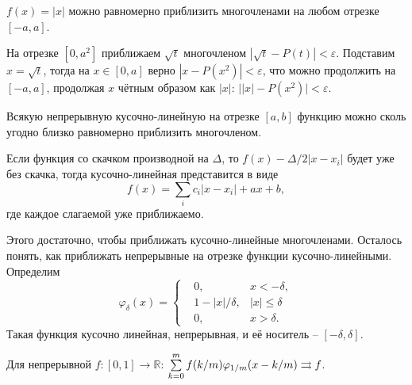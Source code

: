 
\begin{to_lem}
    $f(x) = |x|$ можно равномерно приблизить многочленами на любом отрезке $[-a,a]$.
\end{to_lem}


\begin{uproof}
    На отрезке $[0, a^2]$ приближаем $\sqrt{t}$ многочленом $|\sqrt{t} - P(t)| < \varepsilon$. Подставим $x = \sqrt{t}$, тогда на $x \in [0, a]$ верно $|x - P(x^2)| < \varepsilon$, что можно продолжить на $[-a, a]$, продолжая $x$ чётным образом как $|x|$: $\big| |x| - P(x^2) \bigg| < \varepsilon$. 
\end{uproof}


\begin{to_thr}
    Всякую непрерывную кусочно-линейную на отрезке $[a, b]$ функцию можно сколь угодно близко равномерно приблизить многочленом.
\end{to_thr}

\begin{uproof}
Если функция со скачком производной на $\Delta$, то $f(x) - \Delta/2 |x-x_i|$ будет уже без скачка, тогда кусочно-линейная представится в виде
\begin{equation*}
    f(x) = \sum_i c_i |x - x_i | + a x + b,
\end{equation*}
где каждое слагаемой уже приближаемо. 
\end{uproof}

Этого достаточно, чтобы приближать кусочно-линейные многочленами. Осталось понять, как приближать непрерывные на отрезке функции  кусочно-линейными. Определим
\begin{equation*}
    \varphi_\delta (x) = \left\{\begin{aligned}
        &0, & x < - \delta, \\
        & 1 - |x|/\delta, &|x| \leq \delta \\ 
        &0, & x > \delta.
    \end{aligned}\right.
\end{equation*}
Такая функция кусочно линейная, непрерывная, и её носитель -- $[-\delta, \delta]$.


\begin{to_lem}
    Для непрерывной $f \colon [0,1] \to \mathbb{R}$: $\sum\limits_{k = 0}^{m} f(k/m) \varphi_{1/m} (x - k/m) \rightrightarrows f$.
\end{to_lem}

